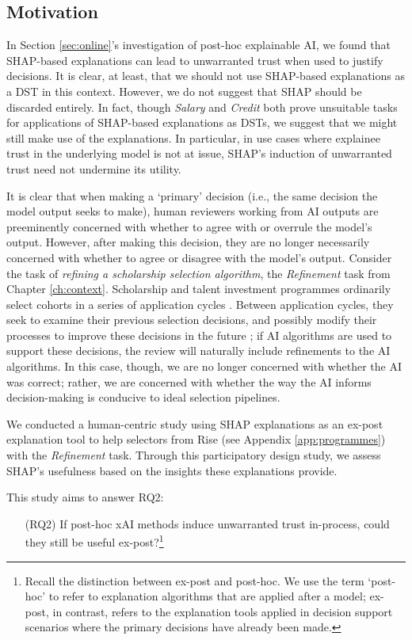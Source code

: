 \subsection{Motivation}
In Section \ref{sec:online}'s investigation of post-hoc explainable AI, we found that SHAP-based explanations can lead to unwarranted trust when used to justify decisions. It is clear, at least, that we should not use SHAP-based explanations as a DST in this context. However, we do not suggest that SHAP should be discarded entirely. In fact, though \emph{Salary} and \emph{Credit} both prove unsuitable tasks for applications of SHAP-based explanations as DSTs, we suggest that we might still make use of the explanations. In particular, in use cases where explainee trust in the underlying model is not at issue, SHAP's induction of unwarranted trust need not undermine its utility.

It is clear that when making a `primary' decision (i.e., the same decision the model output seeks to make), human reviewers working from AI outputs are preeminently concerned with whether to agree with or overrule the model's output. However, after making this decision, they are no longer necessarily concerned with whether to agree or disagree with the model's output. Consider the task of \emph{refining a scholarship selection algorithm}, the \emph{Refinement} task from Chapter \ref{ch:context}. Scholarship and talent investment programmes ordinarily select cohorts in a series of application cycles \cite{li2020hiring}. Between application cycles, they seek to examine their previous selection decisions, and possibly modify their processes to improve these decisions in the future \cite{li2020hiring}; if AI algorithms are used to support these decisions, the review will naturally include refinements to the AI algorithms. In this case, though, we are no longer concerned with whether the AI was correct; rather, we are concerned with whether the way the AI informs decision-making is conducive to ideal selection pipelines.

We conducted a human-centric study using SHAP explanations as an ex-post explanation tool to help selectors from Rise (see Appendix \ref{app:programmes}) with the \emph{Refinement} task. Through this participatory design study, we assess SHAP's usefulness based on the insights these explanations provide.

This study aims to answer RQ2:

\begin{enumerate}
    \item[(RQ2)] If post-hoc xAI methods induce unwarranted trust in-process, could they still be useful ex-post?\footnote{Recall the distinction between ex-post and post-hoc. We use the term `post-hoc' to refer to explanation algorithms that are applied after a model; ex-post, in contrast, refers to the explanation tools applied in decision support scenarios where the primary decisions have already been made.}
\end{enumerate}

